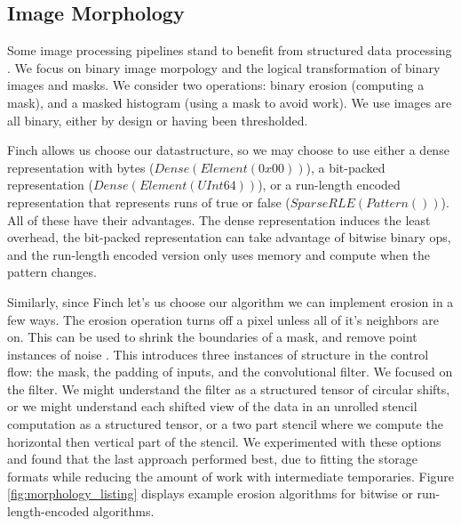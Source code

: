 \subsection{Image Morphology}

Some image processing pipelines stand to benefit from structured data processing \cite{donenfeld_unified_2022}.
%
We focus on binary image morpology and the logical transformation of binary images and masks.
%
We consider two operations: binary erosion (computing a mask), and a masked histogram (using a mask to avoid work).
%
We use images are all binary, either by design or having been thresholded.

Finch allows us choose our datastructure, so we may choose to use either a dense representation with bytes ($Dense(Element(0x00))$), a bit-packed representation ($Dense(Element(UInt64))$), or a run-length encoded representation that represents runs of true or false ($SparseRLE(Pattern())$).
%
All of these have their advantages.
%
The dense representation induces the least overhead, the bit-packed representation can take advantage of bitwise binary ops, and the run-length encoded version only uses memory and compute when the pattern changes. %

Similarly, since Finch let's us choose our algorithm we can implement erosion in a few ways.
%
The erosion operation turns off a pixel unless all of it's neighbors are on.
%
This can be used to shrink the boundaries of a mask, and remove point instances of noise \cite{fisher_hypermedia_1996}.
%
This introduces three instances of structure in the control flow: the mask, the padding of inputs, and the convolutional filter.
%
We focused on the filter.
%
We might understand the filter as a structured tensor of circular shifts, or we might understand each shifted view of the data in an unrolled stencil computation as a structured tensor, or a two part stencil where we compute the horizontal then vertical part of the stencil.
%
We experimented with these options and found that the last approach performed best, due to fitting the storage formats while reducing the amount of work with intermediate temporaries.
%
Figure \ref{fig:morphology_listing} displays example erosion algorithms for bitwise
or run-length-encoded algorithms.
%

